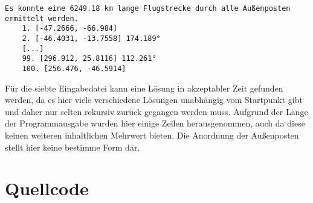 \documentclass[a4paper,10pt,ngerman]{scrartcl}
\begin{document}
    \begin{lstlisting}[frame=single, title=Programmausgabe wenigerkrumm7.txt, breaklines=true,label={lst:lstlisting4}]
    Es konnte eine 6249.18 km lange Flugstrecke durch alle Außenposten ermittelt werden.
    1. [-47.2666, -66.984]
    2. [-46.4031, -13.7558] 174.189°
    [...]
    99. [296.912, 25.8116] 112.261°
    100. [256.476, -46.5914]
    \end{lstlisting}

    Für die siebte Eingabedatei kann eine Lösung in akzeptabler Zeit gefunden werden,
    da es hier viele verschiedene Lösungen unabhängig vom Startpunkt gibt und daher nur selten rekursiv zurück gegangen werden muss.
    Aufgrund der Länge der Programmausgabe wurden hier einige Zeilen herausgenommen, auch da diese keinen weiteren inhaltlichen Mehrwert bieten.
    Die Anordnung der Außenposten stellt hier keine bestimme Form dar.
    
    \newpage
    \section{Quellcode}
    \label{sec:quellcode}
    \label{LastPage}
\end{document}
